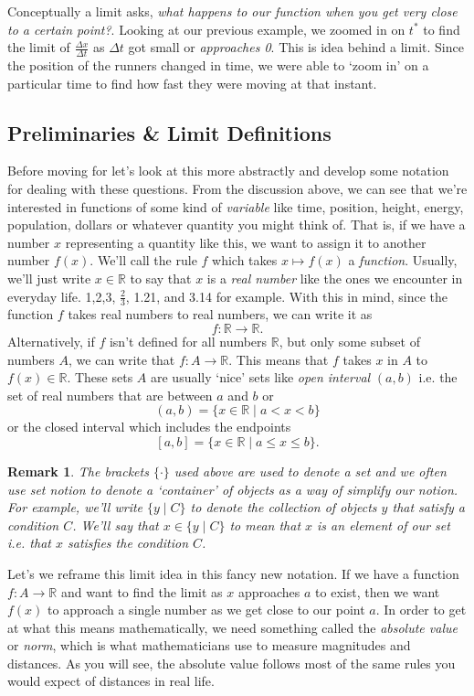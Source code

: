 \documentclass[12pt]{article}
\newcommand{\bbR}{\mathbb{R}}
\theoremstyle{definition}
\theoremstyle{plain}
\newtheorem{rem}[thm]{Remark}
\numberwithin{equation}{section}
\begin{document}
Conceptually a limit asks, \emph{what happens to our function when you get very close to a certain point?}. Looking at our previous example, we zoomed in on $t^*$ to find the limit of $\frac{\Delta x}{\Delta t}$ as $\Delta t$ got small or \emph{approaches 0}. This is idea behind a limit. Since the position of the runners changed in time, we were able to `zoom in' on a particular time to find how fast they were moving at that instant.

\subsection{Preliminaries \& Limit Definitions}

Before moving for let's look at this more abstractly and develop some notation for dealing with these questions. From the discussion above, we can see that we're interested in functions of some kind of \emph{variable} like time, position, height, energy, population, dollars or whatever quantity you might think of. That is, if we have a number $x$ representing a quantity like this, we want to assign it to another number $f(x)$.  We'll call the rule $f$ which takes $x\mapsto f(x)$ a \emph{function}. Usually, we'll just write $x\in\bbR$ to say that $x$ is a \emph{real number} like the ones we encounter in everyday life. 1,2,3, $\frac{2}{3}$, 1.21, and 3.14 for example. With this in mind, since the function $f$ takes real numbers to real numbers, we can write it as
\[
f\colon \bbR \to \bbR.
\] Alternatively, if $f$ isn't defined for all numbers $\bbR$, but only some subset of numbers $A$, we can write that $f\colon A\to\bbR$. This means that $f$ takes $x$ in $A$ to $f(x)\in\bbR$. These sets $A$ are usually `nice' sets like \emph{open interval} $(a,b)$ i.e. the set of real numbers that are between $a$ and $b$ or
\[
(a,b)=\{x\in\bbR \mid a<x<b \}
\]
or the closed interval which includes the endpoints
\[
[a,b]=\{x\in\bbR \mid a\leq x\leq b \}.
\]

\begin{rem}
  The brackets $\{\cdot \}$ used above are used to denote a \emph{set} and we often use set notion to denote a `container' of objects as a way of simplify our notion. For example, we'll write $\{y\mid C \}$ to denote the collection of objects $y$ that satisfy a condition $C$. We'll say that $x\in \{y\mid C \}$ to mean that $x$ is an element of our set i.e. that $x$ satisfies the condition $C$. %
\end{rem}
Let's we reframe this limit idea in this fancy new notation.
If we have a function $f\colon A\to \bbR$ and want to find the limit as $x$ approaches $a$ to exist, then we want $f(x)$ to approach a single number as we get close to our point $a$. In order to get at what this means mathematically, we need something called the \emph{absolute value} or \emph{norm}, which is what mathematicians use to measure magnitudes and distances. As you will see, the absolute value follows most of the same rules you would expect of distances in real life.
\end{document}
